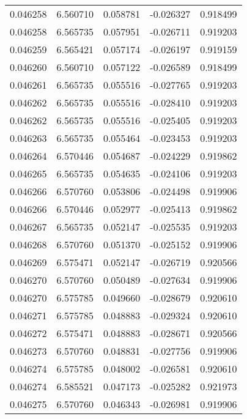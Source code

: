 \begin{tabular}{lrrrr}
0.046258    &  6.560710 &  0.058781 & -0.026327 &             0.918499 \\
0.046258    &  6.565735 &  0.057951 & -0.026711 &             0.919203 \\
0.046259    &  6.565421 &  0.057174 & -0.026197 &             0.919159 \\
0.046260    &  6.560710 &  0.057122 & -0.026589 &             0.918499 \\
0.046261    &  6.565735 &  0.055516 & -0.027765 &             0.919203 \\
0.046262    &  6.565735 &  0.055516 & -0.028410 &             0.919203 \\
0.046262    &  6.565735 &  0.055516 & -0.025405 &             0.919203 \\
0.046263    &  6.565735 &  0.055464 & -0.023453 &             0.919203 \\
0.046264    &  6.570446 &  0.054687 & -0.024229 &             0.919862 \\
0.046265    &  6.565735 &  0.054635 & -0.024106 &             0.919203 \\
0.046266    &  6.570760 &  0.053806 & -0.024498 &             0.919906 \\
0.046266    &  6.570446 &  0.052977 & -0.025413 &             0.919862 \\
0.046267    &  6.565735 &  0.052147 & -0.025535 &             0.919203 \\
0.046268    &  6.570760 &  0.051370 & -0.025152 &             0.919906 \\
0.046269    &  6.575471 &  0.052147 & -0.026719 &             0.920566 \\
0.046270    &  6.570760 &  0.050489 & -0.027634 &             0.919906 \\
0.046270    &  6.575785 &  0.049660 & -0.028679 &             0.920610 \\
0.046271    &  6.575785 &  0.048883 & -0.029324 &             0.920610 \\
0.046272    &  6.575471 &  0.048883 & -0.028671 &             0.920566 \\
0.046273    &  6.570760 &  0.048831 & -0.027756 &             0.919906 \\
0.046274    &  6.575785 &  0.048002 & -0.026581 &             0.920610 \\
0.046274    &  6.585521 &  0.047173 & -0.025282 &             0.921973 \\
0.046275    &  6.570760 &  0.046343 & -0.026981 &             0.919906 \\

\end{tabular}
